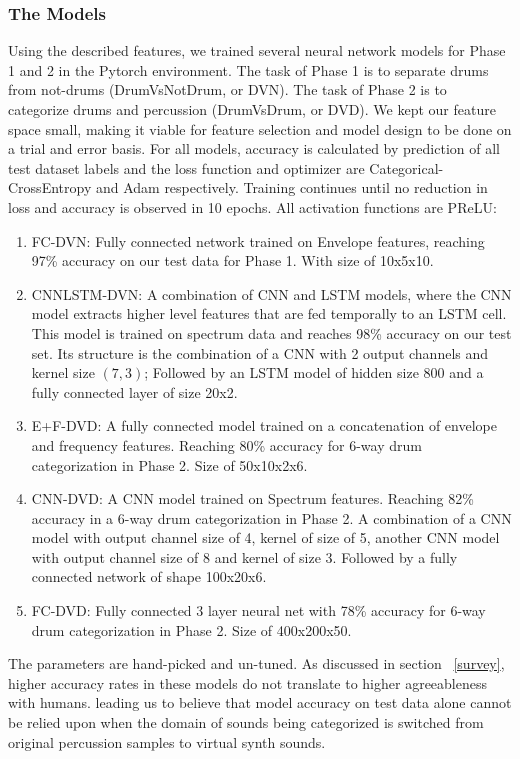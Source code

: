 \documentclass[\main/thesis.tex]{subfiles}
\begin{document}
\subsubsection{The Models}
Using the described features, we trained several neural network models for Phase 1 and 2 in the Pytorch environment. The task of Phase 1 is to separate drums from not-drums (DrumVsNotDrum, or DVN). The task of Phase 2 is to categorize drums and percussion (DrumVsDrum, or DVD). We kept our feature space small, making it viable for feature selection and model design to be done on a trial and error basis. For all models, accuracy is calculated by prediction of all test dataset labels and the loss function and optimizer are Categorical-CrossEntropy and Adam respectively. Training continues until no reduction in loss and accuracy is observed in 10 epochs.  All activation functions are PReLU:
\begin {enumerate}
\item FC-DVN: Fully connected network trained on Envelope features, reaching 97\% accuracy on our test data for Phase 1. With size of 10x5x10.
\item CNNLSTM-DVN: A combination of CNN and LSTM models, where the CNN model extracts higher level features that are fed temporally to an LSTM cell. This model is trained on spectrum data and reaches 98\% accuracy on our test set. Its structure is the combination of a CNN with 2 output channels and kernel size $(7,3)$; Followed by an LSTM model of hidden size 800 and a fully connected layer of size 20x2.
\item E+F-DVD: A fully connected model trained on a concatenation of envelope and frequency features. Reaching 80\% accuracy for 6-way drum categorization in Phase 2. Size of 50x10x2x6.
\item CNN-DVD: A CNN model trained on Spectrum features. Reaching 82\% accuracy in a 6-way drum categorization in Phase 2. A combination of a CNN model with output channel size of 4, kernel of size of 5, another CNN model with output channel size of 8 and kernel of size 3. Followed by a fully connected network of shape 100x20x6.
\item FC-DVD: Fully connected 3 layer neural net with 78\% accuracy for 6-way drum categorization in Phase 2. Size of 400x200x50.
\end{enumerate}
The parameters are hand-picked and un-tuned. As discussed in section ~\ref{survey}, higher accuracy rates in these models do not translate to higher agreeableness with humans. leading us to believe that model accuracy on test data alone cannot be relied upon when the domain of sounds 
being categorized is switched from original percussion samples to virtual synth sounds.
\end{document}
